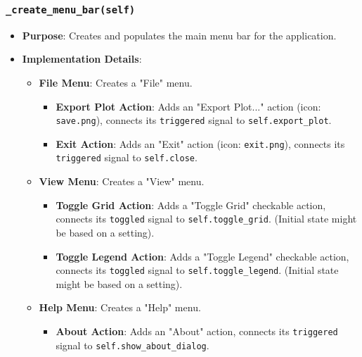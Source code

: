\documentclass[12pt,a4paper]{report}
\begin{document}
\subsubsection{\texttt{\_create\_menu\_bar(self)}}
\begin{itemize}
    \item \textbf{Purpose}: Creates and populates the main menu bar for the application.
    \item \textbf{Implementation Details}:
        \begin{itemize}
            \item \textbf{File Menu}: Creates a "File" menu.
                \begin{itemize}
                    \item \textbf{Export Plot Action}: Adds an "Export Plot..." action (icon: \texttt{save.png}), connects its \texttt{triggered} signal to \texttt{self.export\_plot}.
                    \item \textbf{Exit Action}: Adds an "Exit" action (icon: \texttt{exit.png}), connects its \texttt{triggered} signal to \texttt{self.close}.
                \end{itemize}
            \item \textbf{View Menu}: Creates a "View" menu.
                \begin{itemize}
                    \item \textbf{Toggle Grid Action}: Adds a "Toggle Grid" checkable action, connects its \texttt{toggled} signal to \texttt{self.toggle\_grid}. (Initial state might be based on a setting).
                    \item \textbf{Toggle Legend Action}: Adds a "Toggle Legend" checkable action, connects its \texttt{toggled} signal to \texttt{self.toggle\_legend}. (Initial state might be based on a setting).
                \end{itemize}
            \item \textbf{Help Menu}: Creates a "Help" menu.
                \begin{itemize}
                    \item \textbf{About Action}: Adds an "About" action, connects its \texttt{triggered} signal to \texttt{self.show\_about\_dialog}.
                \end{itemize}
        \end{itemize}
\end{itemize}
\end{document}
